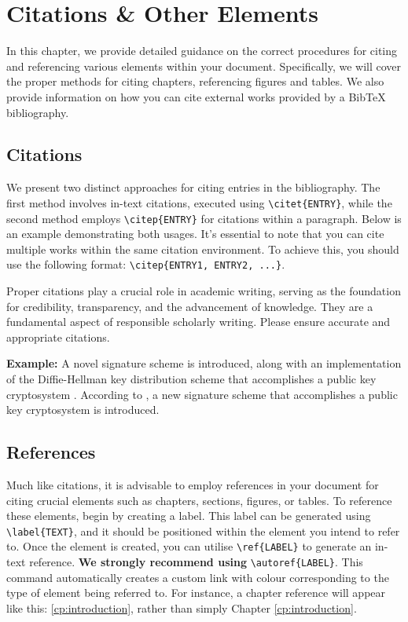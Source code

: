 \chapter{Citations \& Other Elements}
\label{cp:citations}
In this chapter, we provide detailed guidance on the correct procedures for citing and referencing various elements within your document. Specifically, we will cover the proper methods for citing chapters, referencing figures and tables. We also provide information on how you can cite external works provided by a BibTeX bibliography.

\section{Citations}
\label{sec:citations}
We present two distinct approaches for citing entries in the bibliography. The first method involves in-text citations, executed using \verb|\citet{ENTRY}|, while the second method employs \verb|\citep{ENTRY}| for citations within a paragraph. Below is an example demonstrating both usages. It's essential to note that you can cite multiple works within the same citation environment. To achieve this, you should use the following format: \verb|\citep{ENTRY1, ENTRY2, ...}|.

\begin{importantbox}
Proper citations play a crucial role in academic writing, serving as the foundation for credibility, transparency, and the advancement of knowledge. They are a fundamental aspect of responsible scholarly writing. Please ensure accurate and appropriate citations.
\end{importantbox}

\noindent\textbf{Example:} A novel signature scheme is introduced, along with an implementation of the Diffie-Hellman key distribution scheme that accomplishes a public key cryptosystem \citep{Elgamal1985}. According to \citet{Elgamal1985}, a new signature scheme that accomplishes a public key cryptosystem is introduced.

\section{References}
Much like citations, it is advisable to employ references in your document for citing crucial elements such as chapters, sections, figures, or tables. To reference these elements, begin by creating a label. This label can be generated using \verb|\label{TEXT}|, and it should be positioned within the element you intend to refer to. Once the element is created, you can utilise \verb|\ref{LABEL}| to generate an in-text reference. \textbf{We strongly recommend using} \verb|\autoref{LABEL}|. This command automatically creates a custom link with colour corresponding to the type of element being referred to. For instance, a chapter reference will appear like this: \autoref{cp:introduction}, rather than simply Chapter \ref{cp:introduction}. 

